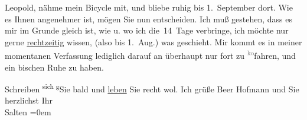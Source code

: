                   Leopold, nähme mein Bicycle mit, und bliebe
               ruhig bis 1. September dort. Wie es Ihnen angenehmer
               ist, mögen Sie nun entscheiden. Ich muß gestehen, dass es mir im Grunde gleich ist,
               wie u. wo ich die 14 Tage verbringe, ich möchte nur gerne \uline{rechtzeitig} wissen, (also bis 1. Aug.) was
               geschieht. Mir kommt es in meiner momentanen Verfassung lediglich darauf an überhaupt
               nur fort zu \substVorne{}\textsuperscript{\textcolor{gray}{ko}}\substDazwischen{}fa\substHinten{}hren, und ein bischen Ruhe zu haben.\pend
           
\pstart
           Schreiben \substVorne{}\textsuperscript{sich g}\substDazwischen{}Sie b\substHinten{}ald und \uline{leben} Sie recht wol. Ich grüße Beer Hofmann und Sie {\\[\baselineskip]}herzlichst Ihr {\\[\baselineskip]}\spacefill\mbox{Salten}\pend
           \leftskip=0em{}\endnumbering{}  \newcommand{\dateiname}{L03159}\newcommand{\titel}{Felix Salten an Arthur Schnitzler, 22. 7. 1895}\newcommand{\editorInnen}{Martin Anton Müller und Laura Untner}
